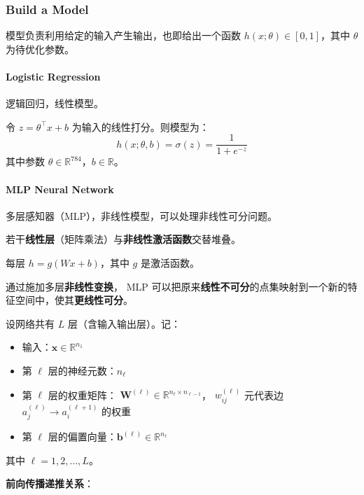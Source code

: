 \subsubsection{Build a Model}\label{build-a-model}

模型负责利用给定的输入产生输出，也即给出一个函数
\(h(x; \theta) \in [0, 1]\)，其中 \(\theta\) 为待优化参数。

\paragraph{Logistic Regression}\label{logistic-regression}

逻辑回归，线性模型。

令 \(z = \theta^\top x + b\) 为输入的线性打分。则模型为： \[
  h(x; \theta, b) = \sigma(z) = \frac{1}{1+e^{-z}}
\] 其中参数 \(\theta \in \mathbb{R}^{784}\)，\(b\in\mathbb{R}\)。

\paragraph{MLP Neural Network}\label{mlp-neural-network}

多层感知器（MLP），非线性模型，可以处理非线性可分问题。

若干\textbf{线性层}（矩阵乘法）与\textbf{非线性激活函数}交替堆叠。

每层 \(h = g(Wx + b)\)，其中 \(g\) 是激活函数。

通过施加多层\textbf{非线性变换}， MLP
可以把原来\textbf{线性不可分}的点集映射到一个新的特征空间中，使其\textbf{更线性可分}。

设网络共有 \(L\) 层（含输入输出层）。记：

\begin{itemize}
  \tightlist
  \item
        输入：\(\mathbf{x} \in \mathbb{R}^{n_1}\)
  \item
        第 \(\ell\) 层的神经元数：\(n_\ell\)
  \item
        第 \(\ell\) 层的权重矩阵：
        \(\mathbf{W}^{(\ell)} \in \mathbb{R}^{n_\ell \times n_{\ell-1}}\)，
        \(w_{ij}^{(\ell)}\) 元代表边
        \(a_j^{(\ell)} \rightarrow a_i^{(\ell+1)}\) 的权重
  \item
        第 \(\ell\)
        层的偏置向量：\(\mathbf{b}^{(\ell)} \in \mathbb{R}^{n_\ell}\)
\end{itemize}

其中 \(\ell = 1, 2, \ldots, L\)。

\textbf{前向传播递推关系}：

